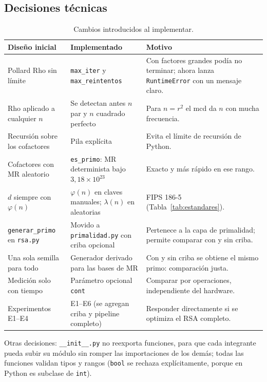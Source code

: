 \subsection{Decisiones técnicas}

\begin{table}[H]
\centering\small
\caption{Cambios introducidos al implementar.}
\label{tab:cambios}
\renewcommand{\arraystretch}{1.2}
\begin{tabularx}{\linewidth}{@{}R{3.4cm} R{4.2cm} Y@{}}
\toprule
\textbf{Diseño inicial} & \textbf{Implementado} & \textbf{Motivo}\\
\midrule
Pollard Rho sin límite & \texttt{max\_iter} y \texttt{max\_reintentos} & Con factores grandes podía no terminar; ahora lanza \texttt{RuntimeError} con un mensaje claro.\\
Rho aplicado a cualquier $n$ & Se detectan antes $n$ par y $n$ cuadrado perfecto & Para $n=r^2$ el mcd da $n$ con mucha frecuencia.\\
Recursión sobre los cofactores & Pila explícita & Evita el límite de recursión de Python.\\
Cofactores con MR aleatorio & \texttt{es\_primo}: MR determinista bajo $3{,}18\times10^{23}$ & Exacto y más rápido en ese rango.\\
$d$ siempre con $\varphi(n)$ & $\varphi(n)$ en claves manuales; $\lambda(n)$ en aleatorias & FIPS 186-5 (Tabla~\ref{tab:estandares}).\\
\texttt{generar\_primo} en \texttt{rsa.py} & Movido a \texttt{primalidad.py} con criba opcional & Pertenece a la capa de primalidad; permite comparar con y sin criba.\\
Una sola semilla para todo & Generador derivado para las bases de MR & Con y sin criba se obtiene el mismo primo: comparación justa.\\
Medición solo con tiempo & Parámetro opcional \texttt{cont} & Comparar por operaciones, independiente del hardware.\\
Experimentos E1--E4 & E1--E6 (se agregan criba y pipeline completo) & Responder directamente si se optimiza el RSA completo.\\
\bottomrule
\end{tabularx}
\end{table}

Otras decisiones: \texttt{\_\_init\_\_.py} no reexporta funciones, para que cada
integrante pueda subir su módulo sin romper las importaciones de los demás;
todas las funciones validan tipos y rangos (\texttt{bool} se rechaza
explícitamente, porque en Python es subclase de \texttt{int}).
